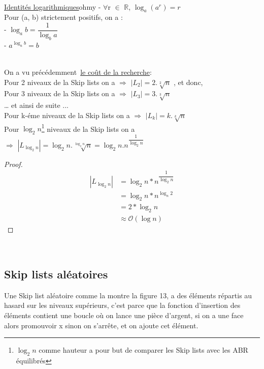 \documentclass[hidelinks,a4paper,12pt]{article}
\begin{document}
~\\ 

\begin{slantedtheorem}{\hyperlink{depart5}{\hypertarget{Rappel1}{Identités logarithmiques}}}{ohmy}
 - $\forall$r  $\in$ $\mathbb{R}$, $\log_a(a^r) = r $ \\
 Pour (a, b) strictement positifs, on a : \\
 - $\log_a b = \dfrac{1}{\log_b a} $\\
 - $ a^{\log_a b} = b $ 
\end{slantedtheorem}	
  
  ~\\
 On a vu précédemment \hyperlink{depart4}{\hypertarget{Coût de la recherche}{le coût de la recherche}}:\\
 Pour 2 niveaux de la Skip lists on a  $\Longrightarrow$ $|L_2| = 2.\sqrt[2]{n}$ , et donc, \\
 Pour 3 niveaux de la Skip lists on a  $\Longrightarrow$ $|L_3| = 3.\sqrt[3]{n}$ \\
 … et ainsi de suite ... \\
 Pour k-éme niveaux de la Skip lists on a $\Longrightarrow$ $|L_k| = k.\sqrt[k]{n}$ \\
 Pour $\log_2 n$\footnote{$\log_2 n$ comme hauteur a pour but de comparer les Skip lists avec les ABR équilibrés } niveaux de la Skip lists on a \\
 $\Longrightarrow$ $|L_{\log_2 n}| = \log_2 n.\sqrt[\log_2 n]{n} = \log_2 n.n^{\dfrac{1}{\log_2 n}} $ 
 
 \begin{proof}
 	\begin{equation} 
 		\begin{aligned}
 |L_{\log_2 n}| & = \log_2 n * n^{\dfrac{1}{\log_2 n}} \nonumber \\
& = \log_2 n*n^{\log_n 2}  \nonumber \\
& = 2*\log_2 n \nonumber \\
& \approx \mathcal{O}(\log n) 
 		\end{aligned}
 	\end{equation}
 \end{proof}

~\\
 
 \subsection{Skip lists aléatoires} 
Une Skip list aléatoire comme la montre la figure 13, a des éléments répartis au hasard sur les niveaux supérieurs, c'est parce que la fonction d'insertion des éléments contient une boucle où on lance une pièce d’argent, si on a une face alors promouvoir x sinon on s'arrête, et on ajoute cet élément.
  
\end{document}
